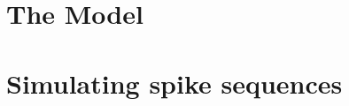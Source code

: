 \documentclass[../main.tex]{subfiles}
\begin{document}
\section{The Model}

\section{Simulating spike sequences}
\end{document}
